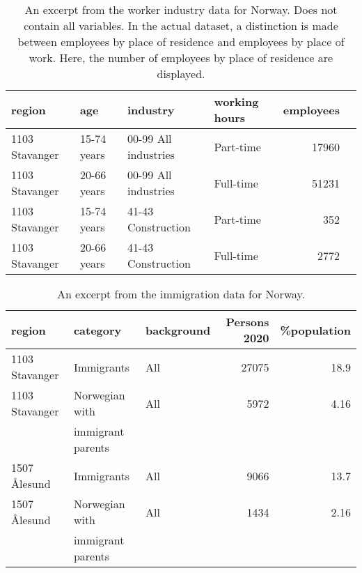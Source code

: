 \begin{table}[H] 
\caption{An excerpt from the worker industry data for Norway. Does not contain all variables. In the actual dataset, a distinction is made between employees by place of residence and employees by place of work. Here, the number of employees by place of residence are displayed.\label{industryNorge}}
\begin{tabular}{l l l l r r}
\toprule
\textbf{region}	& \textbf{age}	& \textbf{industry} & \textbf{working hours} & \textbf{employees}\\
\midrule
1103 Stavanger & 15-74 years & 00-99 All industries & Part-time & 17960\\
1103 Stavanger & 20-66 years & 00-99 All industries & Full-time & 51231\\
1103 Stavanger & 15-74 years & 41-43 Construction  & Part-time & 352\\
1103 Stavanger & 20-66 years & 41-43 Construction  & Full-time & 2772\\
\bottomrule
\end{tabular}
\end{table}
\begin{table}[H] 
\caption{An excerpt from the immigration data for Norway.\label{immigrationNorge}}
\begin{tabular}{l l l r r}
\toprule
\textbf{region}	& \textbf{category} & \textbf{background}	& \textbf{Persons 2020} & \textbf{\%population}\\
\midrule
1103 Stavanger & Immigrants & All  & 27075 & 18.9\\
1103 Stavanger & Norwegian with & All  & 5972 & 4.16\\
& immigrant parents \\
1507 Ålesund & Immigrants & All  & 9066 & 13.7\\
1507 Ålesund & Norwegian with & All &  1434 & 2.16\\
& immigrant parents \\
\bottomrule
\end{tabular}
\end{table}
